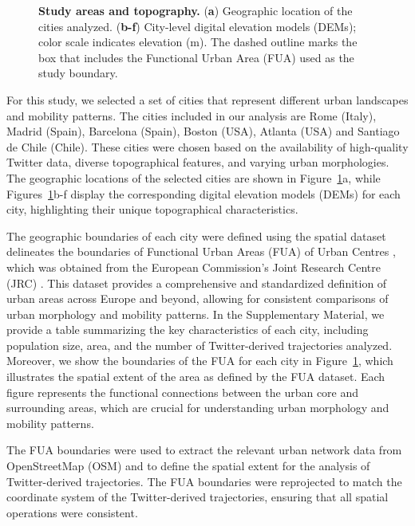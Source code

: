 \documentclass[twocolumn,amsmath,amssymb,floatfix,nature,shownopacs,footinbib,superscriptaddress]{revtex4-1} %
\begin{document}
\begin{figure}[t!]
\centering
\def\svgwidth{0.95\textwidth}
  

\caption{\textbf{Study areas and topography.} (\textbf{a}) Geographic location of the cities analyzed. (\textbf{b-f}) City-level digital elevation models (DEMs); color scale indicates elevation (m). The dashed outline marks the box that includes the Functional Urban Area (FUA) used as the study boundary.}
\label{fig:city_map}
\end{figure}

For this study, we selected a set of cities that represent different urban landscapes and mobility patterns. The cities included in our analysis are Rome (Italy), Madrid (Spain), Barcelona (Spain), Boston (USA), Atlanta (USA) and Santiago de Chile (Chile). These cities were chosen based on the availability of high-quality Twitter data, diverse topographical features, and varying urban morphologies. The geographic locations of the selected cities are shown in Figure~\ref{fig:city_map}a, while Figures~\ref{fig:city_map}b-f display the corresponding digital elevation models (DEMs) for each city, highlighting their unique topographical characteristics.

The geographic boundaries of each city were defined using the spatial dataset delineates the boundaries of Functional Urban Areas (FUA) of Urban Centres , which was obtained from the European Commission's Joint Research Centre (JRC) \cite{jrc-fua}. This dataset provides a comprehensive and standardized definition of urban areas across Europe and beyond, allowing for consistent comparisons of urban morphology and mobility patterns. In the Supplementary Material, we provide a table summarizing the key characteristics of each city, including population size, area, and the number of Twitter-derived trajectories analyzed. Moreover, we show the boundaries of the FUA for each city in Figure~\ref{fig:city_map}, which illustrates the spatial extent of the area as defined by the FUA dataset. Each figure represents the functional connections between the urban core and surrounding areas, which are crucial for understanding urban morphology and mobility patterns.

The FUA boundaries were used to extract the relevant urban network data from OpenStreetMap (OSM) and to define the spatial extent for the analysis of Twitter-derived trajectories. The FUA boundaries were reprojected to match the coordinate system of the Twitter-derived trajectories, ensuring that all spatial operations were consistent.
\end{document}

